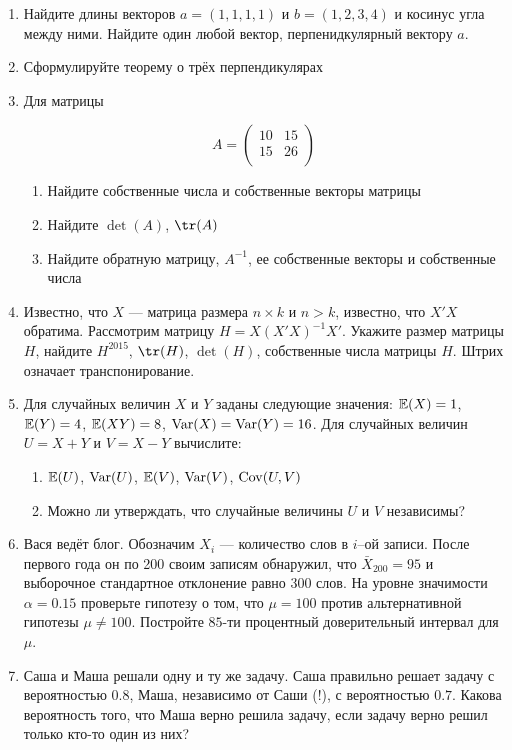 \documentclass[12pt, a4paper]{article}
\theoremstyle{definition}
\begin{document}
\begin{enumerate}
\item Найдите длины векторов $a=(1,1,1,1)$ и $b=(1,2,3,4)$ и косинус угла между ними. Найдите один любой вектор, перпенидкулярный вектору $a$.
\item Сформулируйте теорему о трёх перпендикулярах
\item Для матрицы

\[
A=\begin{pmatrix}
10 & 15 \\
15 & 26 \\
\end{pmatrix}
\]

\begin{enumerate}
\item Найдите собственные числа и собственные векторы матрицы
\item Найдите $\det (A)$, $\tr(A)$
\item Найдите обратную матрицу, $A^{-1}$, ее собственные векторы и собственные числа
\end{enumerate}

\item Известно, что $X$ — матрица размера $n \times k$ и $n>k$, известно, что $X'X$ обратима. Рассмотрим матрицу $H=X(X'X)^{-1}X'$. Укажите размер матрицы $H$, найдите $H^{2015}$, $\tr(H)$, $\det(H)$, собственные числа матрицы $H$. Штрих означает транспонирование.

\item Для случайных величин $X$ и $Y$ заданы следующие значения: $\mathbb{E}(X)=1$, $\mathbb{E}(Y)=4$, $\mathbb{E}(XY)=8$, $\operatorname{Var}(X)=\operatorname{Var}(Y)=16$. Для случайных величин $U=X+Y$ и $V=X-Y$ вычислите:
\begin{enumerate}
\item $\mathbb{E}(U)$, $\operatorname{Var}(U)$, $\mathbb{E}(V)$, $\operatorname{Var}(V)$, $\operatorname{Cov}(U,V)$
\item Можно ли утверждать, что случайные величины $U$ и $V$ независимы?
\end{enumerate}

\item Вася ведёт блог. Обозначим $X_i$ — количество слов в $i$--ой записи. После первого года он по 200 своим записям обнаружил, что $\bar{X}_{200}=95$ и выборочное стандартное отклонение равно $300$ слов. На уровне значимости $\alpha=0.15$ проверьте гипотезу о том, что $\mu=100$ против альтернативной гипотезы $\mu\neq 100$. Постройте $85$-ти процентный доверительный интервал для $\mu$.

\item Саша и Маша решали одну и ту же задачу. Саша правильно решает задачу с вероятностью $0.8$, Маша, независимо от Саши (!), с вероятностью $0.7$. Какова вероятность того, что Маша верно решила задачу, если задачу верно решил только кто-то один из них?

\end{enumerate}
\end{document}
